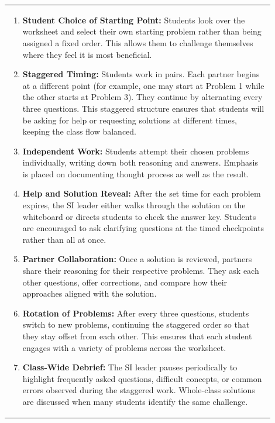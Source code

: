 \documentclass{article}
\begin{document}
{\begin{tabular}{|p{0.9\linewidth}|}
\begin{enumerate}
    \item \textbf{Student Choice of Starting Point:} Students look over the worksheet and select their own starting problem rather than being assigned a fixed order. This allows them to challenge themselves where they feel it is most beneficial.
    
    \item \textbf{Staggered Timing:} Students work in pairs. Each partner begins at a different point (for example, one may start at Problem 1 while the other starts at Problem 3). They continue by alternating every three questions. This staggered structure ensures that students will be asking for help or requesting solutions at different times, keeping the class flow balanced.
    
    \item \textbf{Independent Work:} Students attempt their chosen problems individually, writing down both reasoning and answers. Emphasis is placed on documenting thought process as well as the result.
    
    \item \textbf{Help and Solution Reveal:} After the set time for each problem expires, the SI leader either walks through the solution on the whiteboard or directs students to check the answer key. Students are encouraged to ask clarifying questions at the timed checkpoints rather than all at once.
    
    \item \textbf{Partner Collaboration:} Once a solution is reviewed, partners share their reasoning for their respective problems. They ask each other questions, offer corrections, and compare how their approaches aligned with the solution.
    
    \item \textbf{Rotation of Problems:} After every three questions, students switch to new problems, continuing the staggered order so that they stay offset from each other. This ensures that each student engages with a variety of problems across the worksheet.
    
    \item \textbf{Class-Wide Debrief:} The SI leader pauses periodically to highlight frequently asked questions, difficult concepts, or common errors observed during the staggered work. Whole-class solutions are discussed when many students identify the same challenge.
    

\end{enumerate}
\end{tabular}}
\end{document}
